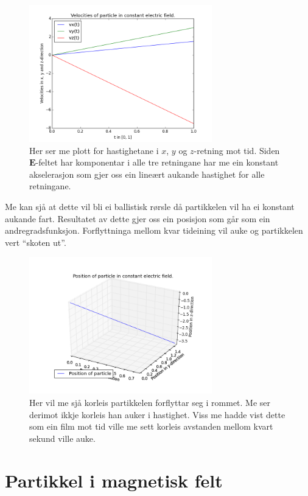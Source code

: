 \documentclass[11pt, a4paper]{article}
\begin{document}
  \begin{figure}[H]
    \centering
    \includegraphics[width=300px]{C2.png}
    \caption{Her ser me plott for hastighetane i $x$, $y$ og $z$-retning mot tid. Siden $\mathbf{E}$-feltet har komponentar i alle tre retningane har me ein konstant akselerasjon 
    som gjer oss ein lineært aukande hastighet for alle retningane.}
  \end{figure}
  Me kan sjå at dette vil bli ei ballistisk rørsle då partikkelen vil ha ei konstant aukande fart. Resultatet av dette gjer oss ein posisjon som går som ein andregradsfunksjon.
  Forflyttninga mellom kvar tideining vil auke og partikkelen vert ``skoten ut''.

  \begin{figure}[H]
    \centering
    \includegraphics[width=300px]{D.png}
    \caption{Her vil me sjå korleis partikkelen forflyttar seg i rommet. Me ser derimot ikkje korleis han auker i hastighet. Viss me hadde vist dette som ein film mot tid ville me 
    sett korleis avstanden mellom kvart sekund ville auke.}
  \end{figure}


\newpage
\section{Partikkel i magnetisk felt}
\end{document}
